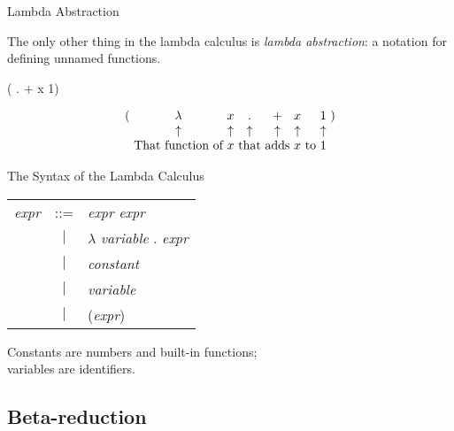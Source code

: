 \documentclass{plt}
\begin{document}
\begin{frame}[fragile=singleslide]{Lambda Abstraction}

The only other thing in the lambda calculus is \emph{lambda
  abstraction}: a notation for defining unnamed functions.

\begin{lcalc}
( . + x 1)
\end{lcalc}

\[
\begin{array}{l*{7}{@{\ }c}@{\ }l}
( & \lambda & x & . & + & x & & 1 & ) \\
  & \uparrow & \uparrow & \uparrow & \uparrow & \uparrow & & \uparrow \\
 & \textrm{That function of} & x & \textrm{that} & \textrm{adds} & x &
  \textrm{to} & 1 \\
\end{array}
\]

\end{frame}

\begin{frame}{The Syntax of the Lambda Calculus}

\begin{center}
\shadowstart
\begin{tabular}{lcl}
\textit{expr} & ::= &
\textit{expr} \textit{expr} \\
& $|$ & $\lambda$ \textit{variable} . \textit{expr} \\
& $|$ & \textit{constant} \\
& $|$ & \textit{variable} \\

& $|$ & (\textit{expr}) \\
\end{tabular}
\shadowend
\end{center}

Constants are numbers and built-in functions;\\
variables are identifiers.

\end{frame}

\subsection{Beta-reduction}
\end{document}
